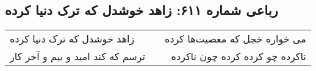 \begin{center}
\section*{رباعی شماره ۶۱۱: زاهد خوشدل که ترک دنیا کرده}
\label{sec:sh611}
\begin{longtable}{l p{0.5cm} r}
زاهد خوشدل که ترک دنیا کرده
&&
می خواره خجل که معصیت‌ها کرده
\\
ترسم که کند امید و بیم و آخر کار
&&
ناکرده چو کرده کرده چون ناکرده
\\
\end{longtable}
\end{center}

